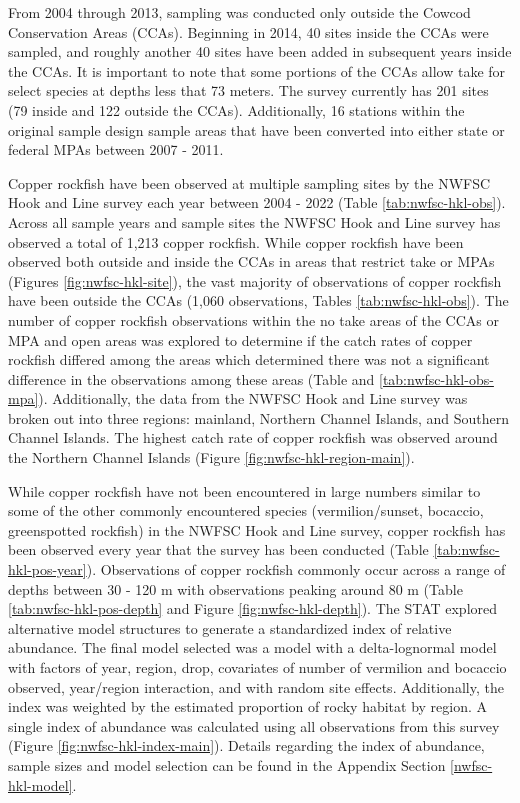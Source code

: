 \documentclass[11pt,
  english,
  letterpaper,
]{article}
\begin{document}
From 2004 through 2013, sampling was conducted only outside the Cowcod Conservation Areas (CCAs). Beginning in 2014, 40 sites inside the CCAs were sampled, and roughly another 40 sites have been added in subsequent years inside the CCAs. It is important to note that some portions of the CCAs allow take for select species at depths less that 73 meters. The survey currently has 201 sites (79 inside and 122 outside the CCAs). Additionally, 16 stations within the original sample design sample areas that have been converted into either state or federal MPAs between 2007 - 2011.

Copper rockfish have been observed at multiple sampling sites by the NWFSC Hook and Line survey each year between 2004 - 2022 (Table \ref{tab:nwfsc-hkl-obs}). Across all sample years and sample sites the NWFSC Hook and Line survey has observed a total of 1,213 copper rockfish. While copper rockfish have been observed both outside and inside the CCAs in areas that restrict take or MPAs (Figures \ref{fig:nwfsc-hkl-site}), the vast majority of observations of copper rockfish have been outside the CCAs (1,060 observations, Tables \ref{tab:nwfsc-hkl-obs}). The number of copper rockfish observations within the no take areas of the CCAs or MPA and open areas was explored to determine if the catch rates of copper rockfish differed among the areas which determined there was not a significant difference in the observations among these areas (Table and \ref{tab:nwfsc-hkl-obs-mpa}). Additionally, the data from the NWFSC Hook and Line survey was broken out into three regions: mainland, Northern Channel Islands, and Southern Channel Islands. The highest catch rate of copper rockfish was observed around the Northern Channel Islands (Figure \ref{fig:nwfsc-hkl-region-main}).

While copper rockfish have not been encountered in large numbers similar to some of the other commonly encountered species (vermilion/sunset, bocaccio, greenspotted rockfish) in the NWFSC Hook and Line survey, copper rockfish has been observed every year that the survey has been conducted (Table \ref{tab:nwfsc-hkl-pos-year}). Observations of copper rockfish commonly occur across a range of depths between 30 - 120 m with observations peaking around 80 m (Table \ref{tab:nwfsc-hkl-pos-depth} and Figure \ref{fig:nwfsc-hkl-depth}). The STAT explored alternative model structures to generate a standardized index of relative abundance. The final model selected was a model with a delta-lognormal model with factors of year, region, drop, covariates of number of vermilion and bocaccio observed, year/region interaction, and with random site effects. Additionally, the index was weighted by the estimated proportion of rocky habitat by region. A single index of abundance was calculated using all observations from this survey (Figure \ref{fig:nwfsc-hkl-index-main}). Details regarding the index of abundance, sample sizes and model selection can be found in the Appendix Section \ref{nwfsc-hkl-model}.
\end{document}
